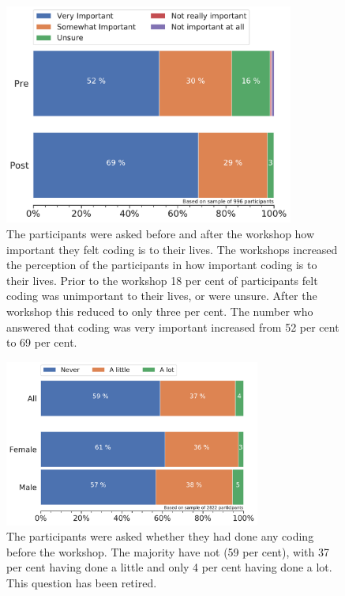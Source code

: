 \documentclass[12pt]{report} %
\begin{document}
\begin{figure}[t!]
    \centering
        \includegraphics[width=0.85\textwidth]{bar_CodingImportance}
\caption{The participants were asked before and after the workshop how important they felt coding is to their lives. The workshops increased the perception of the participants in how important coding is to their lives. Prior to the workshop 18 per cent of participants felt coding was unimportant to their lives, or were unsure. After the workshop this reduced to only three per cent. The number who answered that coding was very important increased from 52 per cent to 69 per cent.}
\label{fig:ACcodingimportance}
\end{figure}

\begin{figure}[t!]
    \centering
        \includegraphics[width=0.75\textwidth]{bar_codedbefore}
\caption{The participants were asked whether they had done any coding before the workshop. The majority have not (59 per cent), with 37 per cent having done a little and only 4 per cent having done a lot. This question has been retired. }
\label{fig:codedbefor}
\end{figure}
\end{document}
